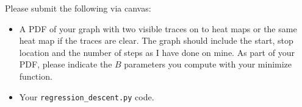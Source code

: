 \begin{fullwidth}
Please submit the following via canvas:
 
\begin{itemize}
\item A PDF of your graph with two visible traces on to heat maps or the same heat map if the traces are clear. The graph should include the start, stop location and the number of steps as I have done on mine. As part of your PDF, please indicate the $B$ parameters you compute with your minimize function.
\item Your {\tt regression\_descent.py} code.
\end{itemize}

\end{fullwidth}

